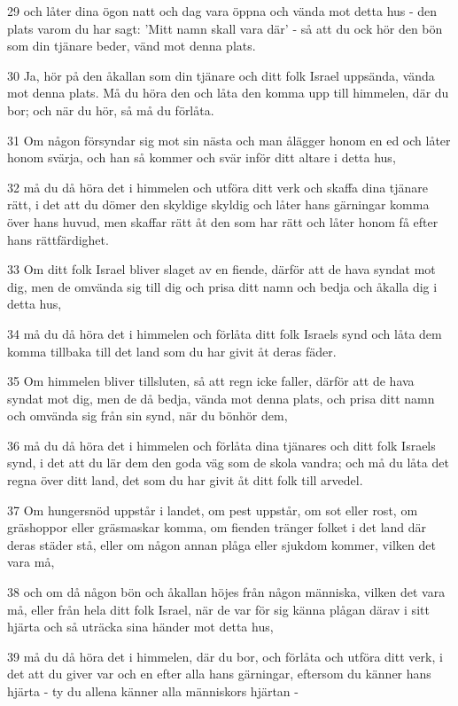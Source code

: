 \par 29 och låter dina ögon natt och dag vara öppna och vända mot detta hus - den plats varom du har sagt: 'Mitt namn skall vara där' - så att du ock hör den bön som din tjänare beder, vänd mot denna plats.
\par 30 Ja, hör på den åkallan som din tjänare och ditt folk Israel uppsända, vända mot denna plats. Må du höra den och låta den komma upp till himmelen, där du bor; och när du hör, så må du förlåta.
\par 31 Om någon försyndar sig mot sin nästa och man ålägger honom en ed och låter honom svärja, och han så kommer och svär inför ditt altare i detta hus,
\par 32 må du då höra det i himmelen och utföra ditt verk och skaffa dina tjänare rätt, i det att du dömer den skyldige skyldig och låter hans gärningar komma över hans huvud, men skaffar rätt åt den som har rätt och låter honom få efter hans rättfärdighet.
\par 33 Om ditt folk Israel bliver slaget av en fiende, därför att de hava syndat mot dig, men de omvända sig till dig och prisa ditt namn och bedja och åkalla dig i detta hus,
\par 34 må du då höra det i himmelen och förlåta ditt folk Israels synd och låta dem komma tillbaka till det land som du har givit åt deras fäder.
\par 35 Om himmelen bliver tillsluten, så att regn icke faller, därför att de hava syndat mot dig, men de då bedja, vända mot denna plats, och prisa ditt namn och omvända sig från sin synd, när du bönhör dem,
\par 36 må du då höra det i himmelen och förlåta dina tjänares och ditt folk Israels synd, i det att du lär dem den goda väg som de skola vandra; och må du låta det regna över ditt land, det som du har givit åt ditt folk till arvedel.
\par 37 Om hungersnöd uppstår i landet, om pest uppstår, om sot eller rost, om gräshoppor eller gräsmaskar komma, om fienden tränger folket i det land där deras städer stå, eller om någon annan plåga eller sjukdom kommer, vilken det vara må,
\par 38 och om då någon bön och åkallan höjes från någon människa, vilken det vara må, eller från hela ditt folk Israel, när de var för sig känna plågan därav i sitt hjärta och så uträcka sina händer mot detta hus,
\par 39 må du då höra det i himmelen, där du bor, och förlåta och utföra ditt verk, i det att du giver var och en efter alla hans gärningar, eftersom du känner hans hjärta - ty du allena känner alla människors hjärtan -
